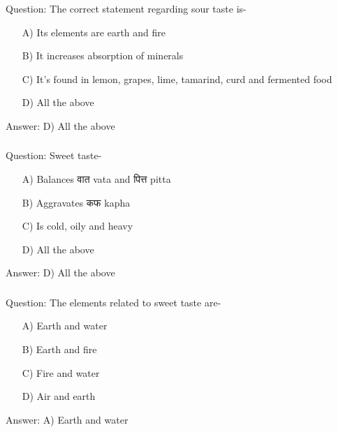 \begin{frame}[fragile]\frametitle{}

Question: The correct statement regarding sour taste is-

\begin{itemize}
\item[A)] Its elements are earth and fire
\item[B)] It increases absorption of minerals
\item[C)] It's found in lemon, grapes, lime, tamarind, curd and fermented food
\item[D)] All the above
\end{itemize}

Answer: D) All the above
\end{frame}

\begin{frame}[fragile]\frametitle{}

Question: Sweet taste-

\begin{itemize}
\item[A)] Balances वात vata and पित्त pitta
\item[B)] Aggravates कफ kapha
\item[C)] Is cold, oily and heavy
\item[D)] All the above
\end{itemize}

Answer: D) All the above
\end{frame}

\begin{frame}[fragile]\frametitle{}

Question: The elements related to sweet taste are-

\begin{itemize}
\item[A)] Earth and water
\item[B)] Earth and fire
\item[C)] Fire and water
\item[D)] Air and earth
\end{itemize}

Answer: A) Earth and water
\end{frame}

